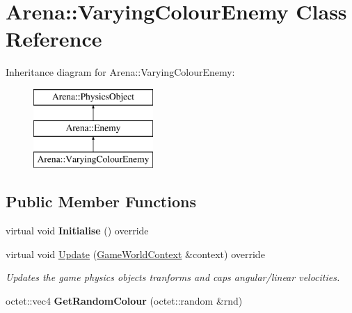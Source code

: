 \hypertarget{class_arena_1_1_varying_colour_enemy}{\section{Arena\+:\+:Varying\+Colour\+Enemy Class Reference}
\label{class_arena_1_1_varying_colour_enemy}
}
Inheritance diagram for Arena\+:\+:Varying\+Colour\+Enemy\+:\begin{figure}[H]
\begin{center}
\leavevmode
\includegraphics[height=3.000000cm]{class_arena_1_1_varying_colour_enemy}
\end{center}
\end{figure}
\subsection*{Public Member Functions}
\begin{DoxyCompactItemize}
\item 
\hypertarget{class_arena_1_1_varying_colour_enemy_a45a91e1d5d404836fb721bca9bde0eef}{virtual void {\bfseries Initialise} () override}\label{class_arena_1_1_varying_colour_enemy_a45a91e1d5d404836fb721bca9bde0eef}

\item 
\hypertarget{class_arena_1_1_varying_colour_enemy_a6e224fa696f679a850f4fe9011b4fae8}{virtual void \hyperlink{class_arena_1_1_varying_colour_enemy_a6e224fa696f679a850f4fe9011b4fae8}{Update} (\hyperlink{struct_arena_1_1_game_world_context}{Game\+World\+Context} \&context) override}\label{class_arena_1_1_varying_colour_enemy_a6e224fa696f679a850f4fe9011b4fae8}

\begin{DoxyCompactList}\small\item\em Updates the game physics objects tranforms and caps angular/linear velocities. \end{DoxyCompactList}\item 
\hypertarget{class_arena_1_1_varying_colour_enemy_a4241cf5a296adce6ff652fb49a452b08}{octet\+::vec4 {\bfseries Get\+Random\+Colour} (octet\+::random \&rnd)}\label{class_arena_1_1_varying_colour_enemy_a4241cf5a296adce6ff652fb49a452b08}

\end{DoxyCompactItemize}
